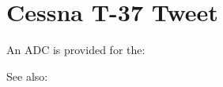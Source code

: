 \section{Cessna T-37 Tweet}

An ADC is provided for the:
\begin{adclist}
\end{adclist}

See also:
\begin{typelist}
\end{typelist}